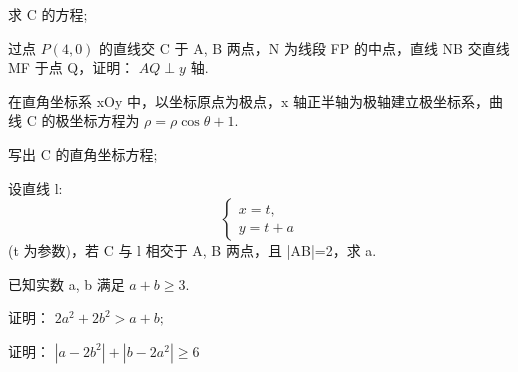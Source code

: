 \documentclass[UTF8,12pt]{ctexart}
\begin{document}
\begin{questions}[start=17]
    \begin{subquestions}
      \item
      求 C 的方程;
      \item
      过点 $P(4,0)$ 的直线交 C 于 A, B 两点，N 为线段 FP 的中点，直线 NB 交直线 MF 于点
        Q，证明： $AQ \perp y$ 轴.
    \end{subquestions}

  \item 在直角坐标系 xOy 中，以坐标原点为极点，x 轴正半轴为极轴建立极坐标系，曲线 C
    的极坐标方程为 $\rho = \rho \cos \theta + 1$.

    \begin{subquestions}
      \item
      写出 C 的直角坐标方程;
      \item
      设直线 l: \[\begin{cases}x=t, \\y=t+a\end{cases}\] (t 为参数)，若 C 与 l 相交于 A,
        B 两点，且 |AB|=2，求 a.
    \end{subquestions}

  \item 已知实数 a, b 满足 $a + b \geqslant 3$.

    \begin{subquestions}
      \item
      证明： $2a^{2}+2b^{2}>a+b;$
      \item
      证明： $\left|a-2b^{2}\right|+\left|b-2a^{2}\right|\geqslant6$
    \end{subquestions}

\end{questions}
\end{document}
